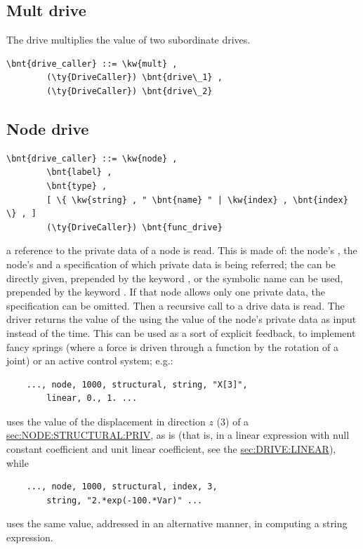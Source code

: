 \subsection{Mult drive}
The  drive multiplies the value of two subordinate drives.
\begin{Verbatim}[commandchars=\\\{\}]
    \bnt{drive_caller} ::= \kw{mult} ,
        (\ty{DriveCaller}) \bnt{drive\_1} ,
        (\ty{DriveCaller}) \bnt{drive\_2}
\end{Verbatim}


\subsection{Node drive}\label{sec:DRIVE:NODE}
\begin{Verbatim}[commandchars=\\\{\}]
    \bnt{drive_caller} ::= \kw{node} ,
        \bnt{label} ,
        \bnt{type} ,
        [ \{ \kw{string} , " \bnt{name} " | \kw{index} , \bnt{index} \} , ]
        (\ty{DriveCaller}) \bnt{func_drive}
\end{Verbatim}
a reference to the private data of a node is read.
This is made of: the node's , the node's 
and a specification of which private data is being referred;
the  can be directly given, prepended by the keyword
, or the symbolic name  can be used, prepended by 
the keyword .
If that node allows only one private data, the specification 
can be omitted.
Then a recursive call to a drive data is read. 
The driver returns the value of the  
 using the value of the 
node's private data as input instead of the time. 
This can be used as a sort of explicit feedback, to implement fancy
springs (where a force is driven through a function by the rotation
of a joint) or an active control system; e.g.:
\begin{verbatim}
    ..., node, 1000, structural, string, "X[3]",
        linear, 0., 1. ...
\end{verbatim}
uses the value of the displacement in direction $z$ (3) of a
\hyperref{\kw{structural node}}{\kw{structural node}, Section~}{}{sec:NODE:STRUCTURAL:PRIV},
as is (that is, in a linear expression with null constant coefficient 
and unit linear coefficient, see the 
\hyperref{\kw{linear} drive}{\kw{linear} drive, Section~}{}{sec:DRIVE:LINEAR}),
while
\begin{verbatim}
    ..., node, 1000, structural, index, 3,
        string, "2.*exp(-100.*Var)" ...
\end{verbatim}
uses the same value, addressed in an alternative manner, in computing
a string expression.

